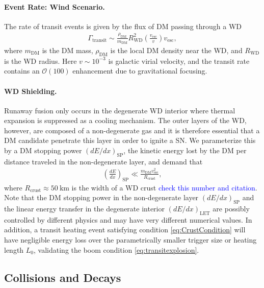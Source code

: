 \documentclass[twocolumn, preprintnumbers,amsmath,amssymb,prd, superscriptaddress]{revtex4}
\newcommand{\OO}{\mathcal{O}}
\def\r{\right)}
\def\l{\left(}
\begin{document}
\paragraph{Event Rate: Wind Scenario.}
The rate of transit events is given by the flux of DM passing through a WD
\begin{align}
  \Gamma_\text{transit} \sim
  \frac{\rho_{\text{DM}}}{m_\text{DM}} R_\text{WD}^2
  \l\frac{v_\text{esc}}{v}\r v_\text{esc},
\label{eq:TransitFluxCondition}
\end{align}
where $m_\text{DM}$ is the DM mass, $\rho_\text{DM}$ is the local DM density near the WD, and $R_\text{WD}$ is the WD radius.
Here $v \sim 10^{-3}$ is galactic virial velocity, and the transit rate contains an $\OO(100)$ enhancement due to gravitational focusing.

\paragraph{WD Shielding.}
Runaway fusion only occurs in the degenerate WD interior where thermal expansion is suppressed as a cooling mechanism.
The outer layers of the WD, however, are composed of a non-degenerate gas and it is therefore essential that a DM candidate penetrate this layer in order to ignite a SN.
We parameterize this by a DM stopping power $(dE/dx)_\text{SP}$, the kinetic energy lost by the DM per distance traveled in the non-degenerate layer, and demand that
\begin{align}
\label{eq:CrustCondition}
  \left( \frac{d E}{d x} \right)_\text{SP} \ll
  \frac{m_\text{DM} v^2_\text{esc}}{R_\text{crust}},
\end{align}
where $R_\text{crust} \approx 50 ~\text{km}$ is the width of a WD crust \cite{Chandrasekhar} \textcolor{blue}{check this number and citation}.
Note that the DM stopping power in the non-degenerate layer $(dE/dx)_\text{SP}$ and the linear energy transfer in the degenerate interior $(dE/dx)_\text{LET}$ are possibly controlled by different physics and may have very different numerical values.
In addition, a transit heating event satisfying condition \eqref{eq:CrustCondition} will have negligible energy loss over the parametrically smaller trigger size or heating length $L_0$, validating the boom condition \eqref{eq:transitexplosion}. 

\subsection{Collisions and Decays}
\end{document}
